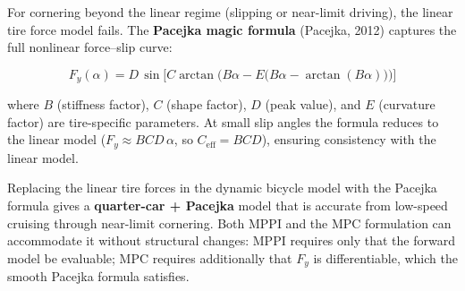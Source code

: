 \documentclass[11pt]{article}
\begin{document}
For cornering beyond the linear regime (slipping or near-limit driving), the
linear tire force model fails.  The \textbf{Pacejka magic formula} (Pacejka,
2012) captures the full nonlinear force--slip curve:

\[
F_y(\alpha) = D\,\sin\!\Big[C\arctan\!\Big(B\alpha - E\big(B\alpha - \arctan(B\alpha)\big)\Big)\Big]
\]

where $B$ (stiffness factor), $C$ (shape factor), $D$ (peak value), and $E$
(curvature factor) are tire-specific parameters.  At small slip angles the
formula reduces to the linear model ($F_y \approx BCD\,\alpha$, so
$C_{\text{eff}} = BCD$), ensuring consistency with the linear model.

Replacing the linear tire forces in the dynamic bicycle model with the Pacejka
formula gives a \textbf{quarter-car + Pacejka} model that is accurate from
low-speed cruising through near-limit cornering.  Both MPPI and the MPC
formulation can accommodate it without structural changes: MPPI requires only
that the forward model be evaluable; MPC requires additionally that $F_y$ is
differentiable, which the smooth Pacejka formula satisfies.
\end{document}
